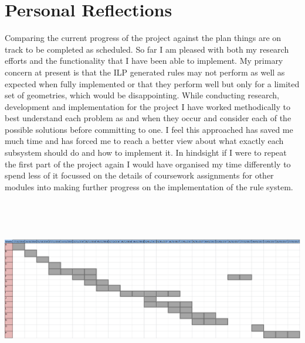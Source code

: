 \documentclass{article}
\begin{document}
\section{Personal Reflections}
Comparing the current progress of the project against the plan things are on track to be completed as scheduled. So far I am pleased with both my research efforts and the functionality that I have been able to implement. My primary concern at present is that the ILP generated rules may not perform as well as expected when fully implemented or that they perform well but only for a limited set of geometries, which would be disappointing. While conducting research, development and implementation for the project I have worked methodically to best understand each problem as and when they occur and consider each of the possible solutions before committing to one. I feel this approached has saved me much time and has forced me to reach a better view about what exactly each subsystem should do and how to implement it. In hindsight if I were to repeat the first part of the project again I would have organised my time differently to spend less of it focussed on the details of coursework assignments for other modules into making further progress on the implementation of the rule system.

\newpage
\pagestyle{empty}
\begin{landscape}
\vspace*{1cm}
\hspace*{-3cm}
\includegraphics[width =700px, height=300px]{TimePlanUpdated2.png} \par
\hspace*{-1cm}

\end{landscape}

\newpage
\end{document}
